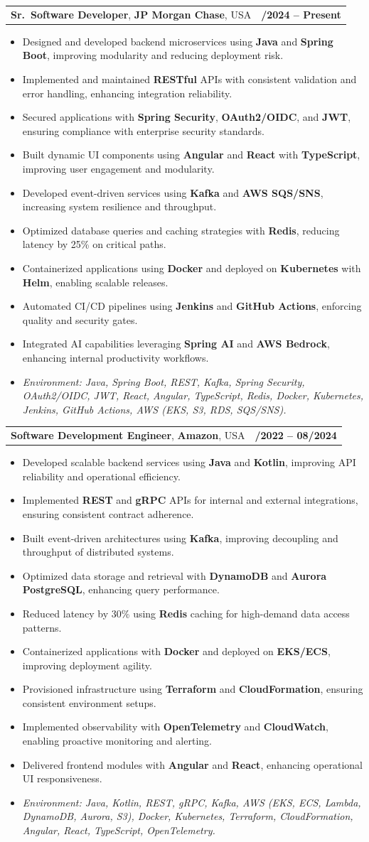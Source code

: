\documentclass[letterpaper,11pt]{article}
\makeatletter
\newcommand{\resumeItem}[1]{
  \item\footnotesize{
    {#1 \vspace{-2pt}}
  }
}
\newcommand{\resumeSubheading}[4]{
  \vspace{-2pt}\item
    \begin{tabular*}{1.0\textwidth}[t]{l@{\extracolsep{\fill}}r}
      \textbf{\fontsize{10pt}{14pt}\selectfont #3}, \textbf{\fontsize{10pt}{14pt}\selectfont #1}, \fontsize{10pt}{14pt}\selectfont #4 & \textbf{\fontsize{10pt}{14pt}\selectfont #2} \\
    \end{tabular*}\vspace{-7pt}
}
\newcommand{\resumeItemListStart}{\begin{itemize}[leftmargin=*]}
\newcommand{\resumeItemListEnd}{\end{itemize}\vspace{-5pt}}
\makeatother
\begin{document}
\resumeSubheading
{JP Morgan Chase}{09/2024 -- Present}
{Sr.\ Software Developer}{USA}
\resumeItemListStart
  \resumeItem{Designed and developed backend microservices using \textbf{Java} and \textbf{Spring Boot}, improving modularity and reducing deployment risk.}
  \resumeItem{Implemented and maintained \textbf{RESTful} APIs with consistent validation and error handling, enhancing integration reliability.}
  \resumeItem{Secured applications with \textbf{Spring Security}, \textbf{OAuth2/OIDC}, and \textbf{JWT}, ensuring compliance with enterprise security standards.}
  \resumeItem{Built dynamic UI components using \textbf{Angular} and \textbf{React} with \textbf{TypeScript}, improving user engagement and modularity.}
  \resumeItem{Developed event-driven services using \textbf{Kafka} and \textbf{AWS SQS/SNS}, increasing system resilience and throughput.}
  \resumeItem{Optimized database queries and caching strategies with \textbf{Redis}, reducing latency by 25\% on critical paths.}
  \resumeItem{Containerized applications using \textbf{Docker} and deployed on \textbf{Kubernetes} with \textbf{Helm}, enabling scalable releases.}
  \resumeItem{Automated CI/CD pipelines using \textbf{Jenkins} and \textbf{GitHub Actions}, enforcing quality and security gates.}
  \resumeItem{Integrated AI capabilities leveraging \textbf{Spring AI} and \textbf{AWS Bedrock}, enhancing internal productivity workflows.}
  \resumeItem{\textit{Environment: Java, Spring Boot, REST, Kafka, Spring Security, OAuth2/OIDC, JWT, React, Angular, TypeScript, Redis, Docker, Kubernetes, Jenkins, GitHub Actions, AWS (EKS, S3, RDS, SQS/SNS).}}
\resumeItemListEnd

\resumeSubheading
{Amazon}{10/2022 -- 08/2024}
{Software Development Engineer}{USA}
\resumeItemListStart
  \resumeItem{Developed scalable backend services using \textbf{Java} and \textbf{Kotlin}, improving API reliability and operational efficiency.}
  \resumeItem{Implemented \textbf{REST} and \textbf{gRPC} APIs for internal and external integrations, ensuring consistent contract adherence.}
  \resumeItem{Built event-driven architectures using \textbf{Kafka}, improving decoupling and throughput of distributed systems.}
  \resumeItem{Optimized data storage and retrieval with \textbf{DynamoDB} and \textbf{Aurora PostgreSQL}, enhancing query performance.}
  \resumeItem{Reduced latency by 30\% using \textbf{Redis} caching for high-demand data access patterns.}
  \resumeItem{Containerized applications with \textbf{Docker} and deployed on \textbf{EKS/ECS}, improving deployment agility.}
  \resumeItem{Provisioned infrastructure using \textbf{Terraform} and \textbf{CloudFormation}, ensuring consistent environment setups.}
  \resumeItem{Implemented observability with \textbf{OpenTelemetry} and \textbf{CloudWatch}, enabling proactive monitoring and alerting.}
  \resumeItem{Delivered frontend modules with \textbf{Angular} and \textbf{React}, enhancing operational UI responsiveness.}
  \resumeItem{\textit{Environment: Java, Kotlin, REST, gRPC, Kafka, AWS (EKS, ECS, Lambda, DynamoDB, Aurora, S3), Docker, Kubernetes, Terraform, CloudFormation, Angular, React, TypeScript, OpenTelemetry.}}
\resumeItemListEnd
\end{document}

